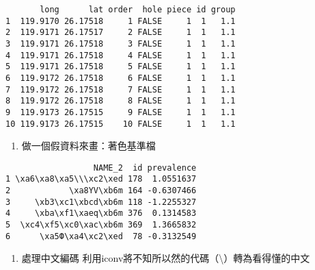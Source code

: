 \documentclass[
]{book}
\newenvironment{Shaded}{\begin{snugshade}}{\end{snugshade}}
\newcommand{\CommentTok}[1]{\textcolor[rgb]{0.56,0.35,0.01}{\textit{#1}}}
\newcommand{\DataTypeTok}[1]{\textcolor[rgb]{0.13,0.29,0.53}{#1}}
\newcommand{\DecValTok}[1]{\textcolor[rgb]{0.00,0.00,0.81}{#1}}
\newcommand{\KeywordTok}[1]{\textcolor[rgb]{0.13,0.29,0.53}{\textbf{#1}}}
\newcommand{\NormalTok}[1]{#1}
\newcommand{\OperatorTok}[1]{\textcolor[rgb]{0.81,0.36,0.00}{\textbf{#1}}}
\newcommand{\StringTok}[1]{\textcolor[rgb]{0.31,0.60,0.02}{#1}}
\providecommand{\tightlist}{%
  \setlength{\itemsep}{0pt}\setlength{\parskip}{0pt}}
\begin{document}
\begin{verbatim}
       long      lat order  hole piece id group
1  119.9170 26.17518     1 FALSE     1  1   1.1
2  119.9171 26.17517     2 FALSE     1  1   1.1
3  119.9171 26.17518     3 FALSE     1  1   1.1
4  119.9171 26.17518     4 FALSE     1  1   1.1
5  119.9171 26.17518     5 FALSE     1  1   1.1
6  119.9172 26.17518     6 FALSE     1  1   1.1
7  119.9172 26.17518     7 FALSE     1  1   1.1
8  119.9172 26.17518     8 FALSE     1  1   1.1
9  119.9173 26.17515     9 FALSE     1  1   1.1
10 119.9173 26.17515    10 FALSE     1  1   1.1
\end{verbatim}

\begin{enumerate}
\def\labelenumi{\arabic{enumi}.}
\setcounter{enumi}{1}
\tightlist
\item
  做一個假資料來畫：著色基準檔
\end{enumerate}

\begin{Shaded}
\end{Shaded}

\begin{verbatim}
                  NAME_2  id prevalence
1 \xa6\xa8\xa5\\\xc2\xed 178  1.0551637
2            \xa8ΥV\xb6m 164 -0.6307466
3     \xb3\xc1\xbcd\xb6m 118 -1.2255327
4     \xba\xf1\xaeq\xb6m 376  0.1314583
5  \xc4\xf5\xc0\xac\xb6m 369  1.3665832
6      \xa5Ф\xa4\xc2\xed  78 -0.3132549
\end{verbatim}

\begin{enumerate}
\def\labelenumi{\arabic{enumi}.}
\setcounter{enumi}{2}
\tightlist
\item
  處理中文編碼
  利用iconv將不知所以然的代碼（\textbackslash{}\xed）轉為看得懂的中文
\end{enumerate}

\begin{Shaded}
\end{Shaded}
\end{document}
